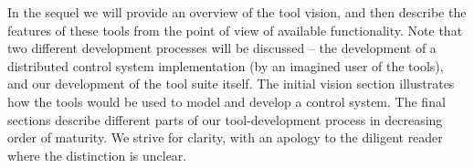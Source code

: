 In the sequel we will provide an overview of the tool vision, and then describe the 
features of these tools from the point of view of available functionality.   
Note that two different development processes will be discussed -- the development of a distributed control system implementation (by an imagined user of the tools), and our development of the tool suite itself.  The initial vision section illustrates how the tools would be used to model and develop a control system.  The final sections describe different parts of our tool-development process in decreasing order of maturity.  We strive for clarity, with an apology to the diligent reader where the distinction is unclear.
